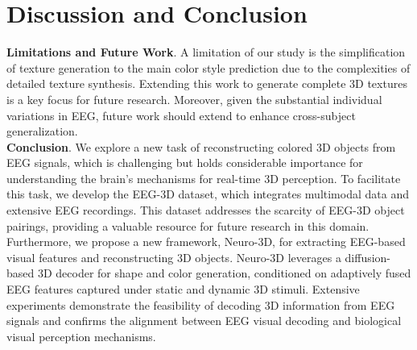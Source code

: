 \section{Discussion and Conclusion}
\textbf{Limitations and Future Work}. A limitation of our study is the simplification of texture generation to the main color style prediction due to the complexities of detailed texture synthesis. Extending this work to generate complete 3D textures is a key focus for future research. Moreover, given the substantial individual variations in EEG, future work should extend to enhance cross-subject generalization.\\ 
\textbf{Conclusion}. We explore a new task of reconstructing colored 3D objects from EEG signals, which is challenging but holds considerable importance for understanding the brain's mechanisms for real-time 3D perception. To facilitate this task, we develop the EEG-3D dataset, which integrates multimodal data and extensive EEG recordings. This dataset addresses the scarcity of EEG-3D object pairings, providing a valuable resource for future research in this domain. Furthermore, we propose a new framework, Neuro-3D, for extracting EEG-based visual features and reconstructing 3D objects. Neuro-3D leverages a diffusion-based 3D decoder for shape and color generation, conditioned on adaptively fused EEG features captured under static and dynamic 3D stimuli.
Extensive experiments demonstrate the feasibility of decoding 3D information from EEG signals and confirms the alignment between EEG visual decoding and biological visual perception mechanisms.